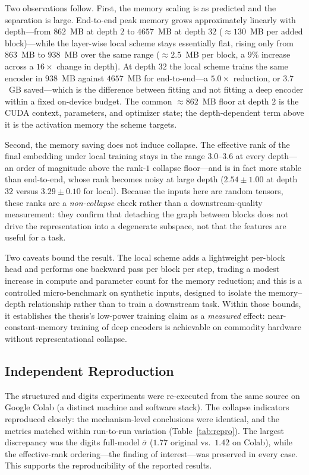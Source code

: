 Two observations follow. First, the memory scaling is as predicted and the
separation is large. End-to-end peak memory grows approximately linearly with
depth---from $862$~MB at depth $2$ to $4657$~MB at depth $32$ ($\approx 130$~MB
per added block)---while the layer-wise local scheme stays essentially flat,
rising only from $863$~MB to $938$~MB over the same range ($\approx 2.5$~MB per
block, a $9\%$ increase across a $16\times$ change in depth). At depth $32$ the
local scheme trains the same encoder in $938$~MB against $4657$~MB for
end-to-end---a $5.0\times$ reduction, or $3.7$~GB saved---which is the
difference between fitting and not fitting a deep encoder within a fixed
on-device budget. The common $\approx 862$~MB floor at depth $2$ is the CUDA
context, parameters, and optimizer state; the depth-dependent term above it is
the activation memory the scheme targets.

Second, the memory saving does not induce collapse. The effective rank of the
final embedding under local training stays in the range $3.0$--$3.6$ at every
depth---an order of magnitude above the rank-$1$ collapse floor---and is in fact
more stable than end-to-end, whose rank becomes noisy at large depth
($2.54 \pm 1.00$ at depth $32$ versus $3.29 \pm 0.10$ for local). Because the
inputs here are random tensors, these ranks are a \emph{non-collapse} check
rather than a downstream-quality measurement: they confirm that detaching the
graph between blocks does not drive the representation into a degenerate
subspace, not that the features are useful for a task.

Two caveats bound the result. The local scheme adds a lightweight per-block
head and performs one backward pass per block per step, trading a modest
increase in compute and parameter count for the memory reduction; and this is a
controlled micro-benchmark on synthetic inputs, designed to isolate the
memory--depth relationship rather than to train a downstream task. Within those
bounds, it establishes the thesis's low-power training claim as a \emph{measured}
effect: near-constant-memory training of deep encoders is achievable on
commodity hardware without representational collapse.

\subsection{Independent Reproduction}
\label{sec:repro}
The structured and digits experiments were re-executed from the same source
on Google Colab (a distinct machine and software stack). The collapse
indicators reproduced closely: the mechanism-level conclusions were
identical, and the metrics matched within run-to-run variation
(Table~\ref{tab:repro}). The largest discrepancy was the digits full-model
$\bar\sigma$ ($1.77$ original vs.\ $1.42$ on Colab), while the effective-rank
ordering---the finding of interest---was preserved in every case. This
supports the reproducibility of the reported results.

